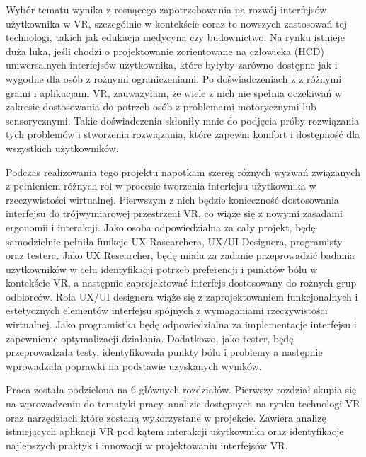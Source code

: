 \documentclass[xodstep]{wnspt}
\begin{document}
Wybór tematu wynika z rosnącego zapotrzebowania na rozwój interfejsów użytkownika w VR, szczególnie w kontekście coraz to nowszych zastosowań tej technologi, takich jak edukacja medycyna czy budownictwo. Na rynku istnieje duża luka, jeśli chodzi o projektowanie zorientowane na człowieka (HCD) uniwersalnych interfejsów użytkownika, które byłyby zarówno dostępne jak i wygodne dla osób z rożnymi ograniczeniami. Po doświadczeniach z z różnymi grami i aplikacjami VR, zauważyłam, że wiele z nich nie spełnia oczekiwań w zakresie dostosowania do potrzeb osób z problemami motorycznymi lub sensorycznymi. Takie doświadczenia skłoniły mnie do podjęcia próby rozwiązania tych problemów i stworzenia rozwiązania, które zapewni komfort i dostępność dla wszystkich użytkowników.

Podczas realizowania tego projektu napotkam szereg różnych wyzwań związanych z pełnieniem różnych rol w procesie tworzenia interfejsu użytkownika w rzeczywistości wirtualnej. Pierwszym z nich będzie konieczność dostosowania interfejsu do trójwymiarowej przestrzeni VR, co wiąże się z nowymi zasadami ergonomii i interakcji. Jako osoba odpowiedzialna za cały projekt, będę samodzielnie pełniła funkcje UX Rasearchera, UX/UI Designera, programisty oraz testera. Jako UX Researcher, będę miała za zadanie przeprowadzić badania użytkowników w celu identyfikacji potrzeb preferencji i punktów bólu w kontekście VR, a następnie zaprojektować interfejs dostosowany do rożnych grup odbiorców. Rola UX/UI designera wiąże się z zaprojektowaniem funkcjonalnych i estetycznych elementów interfejsu spójnych z wymaganiami rzeczywistości wirtualnej. Jako programistka będę odpowiedzialna za implementacje interfejsu i zapewnienie optymalizacji działania. Dodatkowo, jako tester, będę przeprowadzała testy, identyfikowała punkty bólu i problemy a następnie wprowadzała poprawki na podstawie uzyskanych wyników.

Praca została podzielona na 6 głównych rozdziałów. Pierwszy rozdział skupia się na wprowadzeniu do tematyki pracy, analizie dostępnych na rynku technologi VR oraz narzędziach które zostaną wykorzystane w projekcie. Zawiera analizę istniejących aplikacji VR pod kątem interakcji użytkownika oraz identyfikacje najlepszych praktyk i innowacji w projektowaniu  interfejsów VR.
\end{document}
